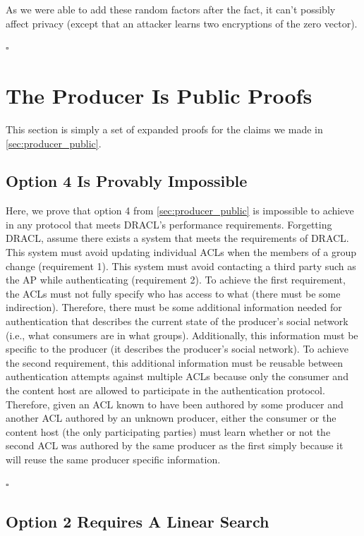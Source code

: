 \documentclass[pdftex,12pt,a4papaer,twoside,notitlepage]{report}
\begin{document}
\begin{appendices}
As we were able to add these random factors after the fact, it can't possibly
affect privacy (except that an attacker learns two encryptions of the zero
vector).

{\hfill $\square$}

\section{The Producer Is Public Proofs}

This section is simply a set of expanded proofs for the claims we made in
\cref{sec:producer_public}.

\subsection{Option 4 Is Provably Impossible}
\label{proof:public-producer-4}

Here, we prove that option 4 from \cref{sec:producer_public} is impossible to
achieve in any protocol that meets DRACL's performance requirements. Forgetting
DRACL, assume there exists a system that meets the requirements of DRACL. This
system must avoid updating individual ACLs when the members of a group change
(requirement 1). This system must avoid contacting a third party such as the AP
while authenticating (requirement 2). To achieve the first requirement, the ACLs
must not fully specify who has access to what (there must be some indirection).
Therefore, there must be some additional information needed for authentication
that describes the current state of the producer's social network (i.e., what
consumers are in what groups). Additionally, this information must be specific
to the producer (it describes the producer's social network). To achieve the
second requirement, this additional information must be reusable between
authentication attempts against multiple ACLs because only the consumer and the
content host are allowed to participate in the authentication protocol.
Therefore, given an ACL known to have been authored by some producer and another
ACL authored by an unknown producer, either the consumer or the content host
(the only participating parties) must learn whether or not the second ACL was
authored by the same producer as the first simply because it will reuse the same
producer specific information.

{\hfill $\square$}

\subsection{Option 2 Requires A Linear Search}
\label{proof:public-producer-2}


\end{appendices}
\end{document}
